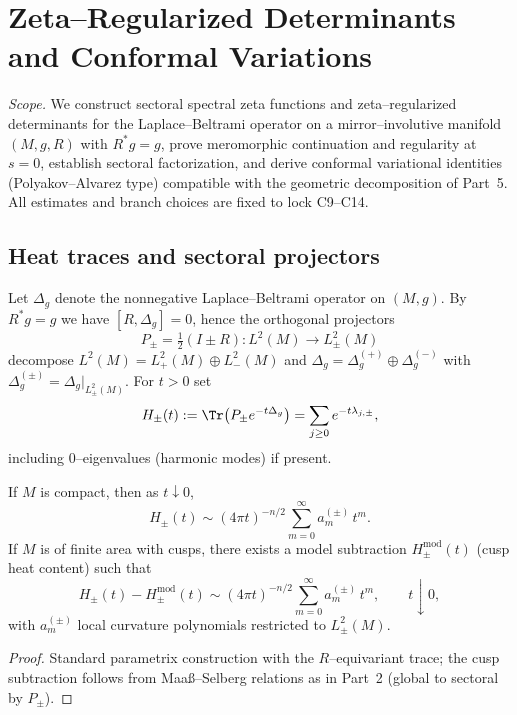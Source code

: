 \section{Zeta–Regularized Determinants and Conformal Variations}
\label{sec:ch6-part6-determinants} \relax \hspace{0pt}
\FlowBreaker
\noindent\emph{Scope.} We construct sectoral spectral zeta functions and zeta–regularized determinants for the Laplace–Beltrami operator on a mirror–involutive manifold $(M,g,R)$ with $R^*g=g$, prove meromorphic continuation and regularity at $s=0$, establish sectoral factorization, and derive conformal variational identities (Polyakov–Alvarez type) compatible with the geometric decomposition of Part~5. All estimates and branch choices are fixed to lock C9–C14.  %


\subsection{Heat traces and sectoral projectors}
\label{subsec:ch6-part6-heat} \relax \hspace{0pt}
Let $\Delta_g$ denote the nonnegative Laplace–Beltrami operator on $(M,g)$. By $R^*g=g$ we have $[R,\Delta_g]=0$, hence the orthogonal projectors
\[
P_\pm=\tfrac12(I\pm R):L^2(M)\to L^2_\pm(M)
\]
decompose $L^2(M)=L^2_+(M)\oplus L^2_-(M)$ and $\Delta_g=\Delta_g^{(+)}\oplus \Delta_g^{(-)}$ with $\Delta_g^{(\pm)}=\Delta_g|_{L^2_\pm(M)}$. For $t>0$ set
\[
H_\pm(t):=\Tr\!\left(P_\pm e^{-t\Delta_g}\right)=\sum_{j\ge 0} e^{-t\lambda_{j,\pm}},
\]
including $0$–eigenvalues (harmonic modes) if present.  %

\begin{lemma}
\label{lem:heat-exp}
If $M$ is compact, then as $t\downarrow 0$,
\[
H_\pm(t)\sim (4\pi t)^{-n/2}\sum_{m=0}^{\infty} a^{(\pm)}_m\, t^{m}.
\]
If $M$ is of finite area with cusps, there exists a model subtraction $H^{\mathrm{mod}}_\pm(t)$ (cusp heat content) such that
\[
H_\pm(t)-H^{\mathrm{mod}}_\pm(t)\sim (4\pi t)^{-n/2}\sum_{m=0}^{\infty} a^{(\pm)}_m\, t^{m},\qquad t\downarrow 0,
\]
with $a^{(\pm)}_m$ local curvature polynomials restricted to $L^2_\pm(M)$.  %
\end{lemma}

\begin{proof}
Standard parametrix construction with the $R$–equivariant trace; the cusp subtraction follows from Maaß–Selberg relations as in Part~2 (global to sectoral by $P_\pm$).  %
\end{proof}

